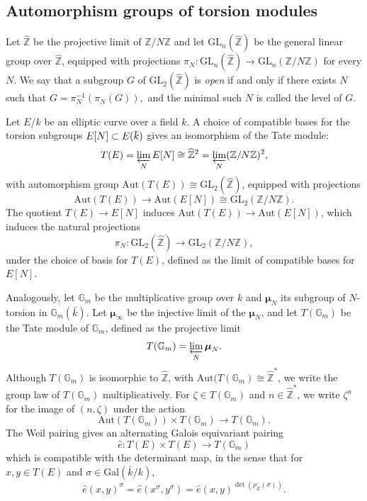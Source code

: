 \documentclass{amsart}
\newcommand{\GG}{\mathbb{G}}
\newcommand{\ZZ}{\mathbb{Z}}
\newcommand{\ZZhat}{\widehat{\ZZ}}
\newcommand{\GL}{\mathrm{GL}}
\newcommand{\Aut}{\mathrm{Aut}}
\newcommand{\isom}{\cong}
\newcommand{\overbar}[1]{\mkern 2.0mu\overline{\mkern-2.0mu#1\mkern-2.0mu}\mkern 2.0mu}
\newcommand{\kbar}{\overbar{\smash{k}\vphantom{t}}}
\newcommand{\Gal}{\mathrm{Gal}}
\newcommand{\mmu}{\boldsymbol{\mu}}
\begin{document}
\subsection*{Automorphism groups of torsion modules}

Let $\ZZhat$ be the projective limit of $\ZZ/N\ZZ$ and let $\GL_n(\ZZhat)$
be the general linear group over $\ZZhat$, equipped with projections
$\pi_N : \GL_n(\ZZhat) \to \GL_n(\ZZ/N\ZZ)$ for every $N$.
We say that a subgroup $G$ of $\GL_2(\ZZhat)$ is {\it open}
if and only if there exists $N$ such that
$
G = \pi_N^{-1}(\pi_N(G)),
$
and the minimal such $N$ is called the level of $G$.

Let $E/k$ be an elliptic curve over a field $k$. A choice of
compatible bases for the torsion subgroups $E[N] \subset E(\kbar)$
gives an isomorphism of the Tate module:
$$
T(E) = \varprojlim_{N} E[N] \isom \ZZhat^2 = \varprojlim_{N} (\ZZ/N\ZZ)^2,
$$
with automorphism group $\Aut(T(E)) \isom \GL_2(\ZZhat)$, equipped
with projections $$
\Aut(T(E)) \to \Aut(E[N]) \isom \GL_2(\ZZ/N\ZZ).
$$
The quotient $T(E) \to E[N]$ induces $\Aut(T(E)) \to \Aut(E[N])$,
which induces the natural projections
$$
\pi_N:\GL_2(\ZZhat) \longrightarrow
\GL_2(\ZZ/N\ZZ),
$$
under the choice of basis for $T(E)$, defined as the limit of
compatible bases for $E[N]$.

Analogously, let $\GG_m$ be the multiplicative group over $k$ and $\mmu_N$ its
subgroup of $N$-torsion in $\GG_m(\bar{k})$.  Let $\mmu_\infty$ be the injective
limit of the $\mmu_N$, and let $T(\GG_m)$ be the Tate module of $\GG_m$, defined
as the projective limit
$$
T(\GG_m) = \varprojlim_{N} \mmu_N.
$$
Although $T(\GG_m)$ is isomorphic to $\ZZhat$, with $\Aut(T(\GG_m) \isom \ZZhat^*$,
we write the group law of $T(\GG_m)$ multiplicatively. For $\zeta \in T(\GG_m)$ and
$n \in \ZZhat^*$, we write $\zeta^n$ for the image  of $(n,\zeta)$ under the action
$$
\Aut(T(\GG_m)) \times T(\GG_m) \to T(\GG_m).
$$
The Weil pairing gives an alternating Galois equivariant pairing
$$
\hat{e}: T(E) \times T(E) \longrightarrow T(\GG_m)
$$
which is compatible with the determinant map, in the sense that for
$x, y \in T(E)$ and $\sigma \in \Gal(\bar{k}/k)$, 
$$
\hat{e}(x,y)^\sigma =
\hat{e}(x^\sigma,y^\sigma) =
\hat{e}(x,y)^{\det(\rho_E(\sigma))}.
$$
\end{document}
